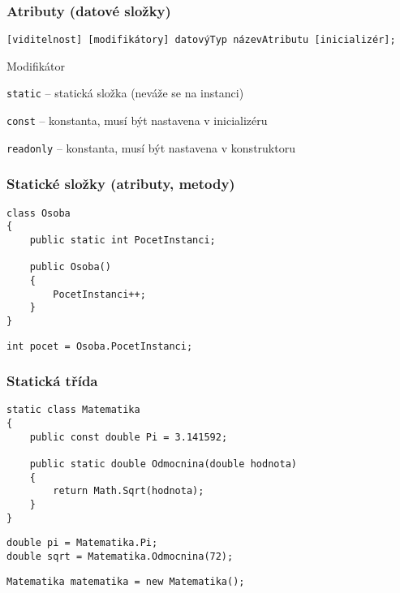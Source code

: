 \begin{frame}[fragile]
\frametitle{Atributy (datové složky)}
\vfill
\begin{noteblock}{}
\begin{lstlisting}
[viditelnost] [modifikátory] datovýTyp názevAtributu [inicializér];
\end{lstlisting}
\end{noteblock}
\vfill
\begin{bitemize}{Modifikátor}
\item \lstinline|static| -- statická složka (neváže se na instanci)
\item \lstinline|const| -- konstanta, musí být nastavena v inicializéru
\item \lstinline|readonly| -- konstanta, musí být nastavena v konstruktoru
\end{bitemize}
\vfill
\end{frame}



\begin{frame}[fragile]
\frametitle{Statické složky (atributy, metody)}
\vfill
\begin{yesblock}
\begin{lstlisting}
class Osoba
{
    public static int PocetInstanci;

    public Osoba() 
    { 
        PocetInstanci++; 
    }
}
\end{lstlisting}
\end{yesblock}
\vfill
\begin{yesblock}
\begin{lstlisting}
int pocet = Osoba.PocetInstanci;
\end{lstlisting}
\end{yesblock}
\vfill
\end{frame}



\begin{frame}[fragile]
\frametitle{Statická třída}
\vfill
\begin{yesblock}
\begin{lstlisting}
static class Matematika
{
    public const double Pi = 3.141592;

    public static double Odmocnina(double hodnota)
    {
        return Math.Sqrt(hodnota);
    }
}
\end{lstlisting}
\end{yesblock}
\vfill
\begin{yesblock}
\begin{lstlisting}
double pi = Matematika.Pi;
double sqrt = Matematika.Odmocnina(72);
\end{lstlisting}
\end{yesblock}
\vfill
\begin{noblock}
\begin{lstlisting}
Matematika matematika = new Matematika();
\end{lstlisting}
\end{noblock}
\vfill
\end{frame}






